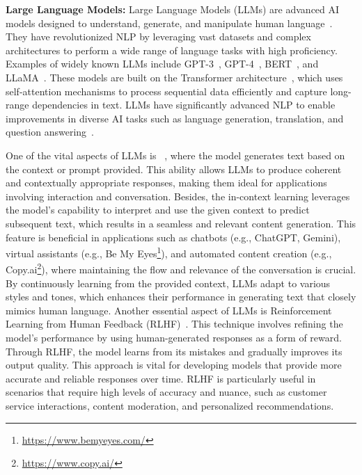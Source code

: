 \documentclass[5p,twocolumn]{elsarticle}
\begin{document}
\textbf{Large Language Models:}
Large Language Models (LLMs) are advanced AI models designed to understand, generate, and manipulate human language~\cite{zhao2023survey,yang2024harnessinga,chang2024survey,han2024llm}. They have revolutionized NLP by leveraging vast datasets and complex architectures to perform a wide range of language tasks with high proficiency. Examples of widely known LLMs include GPT-3~\cite{brown2020language}, GPT-4~\cite{openai2024gpt4}, BERT~\cite{devlin2018bert}, and LLaMA~\cite{touvron2023llama}. These models are built on the Transformer architecture~\cite{vaswani2017attention}, which uses self-attention mechanisms to process sequential data efficiently and capture long-range dependencies in text. LLMs have significantly advanced NLP to enable improvements in diverse AI tasks such as language generation, translation, and question answering~\cite{chowdhary2020natural}.

One of the vital aspects of LLMs is ~\cite{brown2020language}, where the model generates text based on the context or prompt provided. This ability allows LLMs to produce coherent and contextually appropriate responses, making them ideal for applications involving interaction and conversation. Besides, the in-context learning leverages the model's capability to interpret and use the given context to predict subsequent text, which results in a seamless and relevant content generation. This feature is beneficial in applications such as chatbots (e.g., ChatGPT, Gemini), virtual assistants (e.g., Be My Eyes\footnote{\url{https://www.bemyeyes.com/}}), and automated content creation (e.g., Copy.ai\footnote{\url{https://www.copy.ai/}}), where maintaining the flow and relevance of the conversation is crucial. By continuously learning from the provided context, LLMs adapt to various styles and tones, which enhances their performance in generating text that closely mimics human language. Another essential aspect of LLMs is Reinforcement Learning from Human Feedback (RLHF)~\cite{christiano2017deep,ziegler2019fine}. This technique involves refining the model's performance by using human-generated responses as a form of reward. Through RLHF, the model learns from its mistakes and gradually improves its output quality. This approach is vital for developing models that provide more accurate and reliable responses over time. RLHF is particularly useful in scenarios that require high levels of accuracy and nuance, such as customer service interactions, content moderation, and personalized recommendations.
\end{document}
